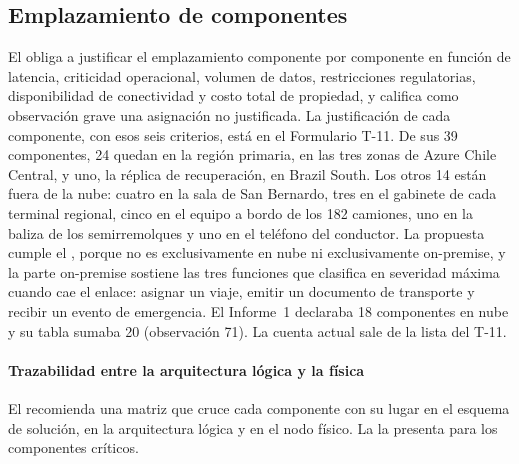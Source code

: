 \subsection{Emplazamiento de componentes}\label{sec:4-emplazamiento}

El  obliga a justificar el emplazamiento componente por componente en función de
latencia, criticidad operacional, volumen de datos, restricciones regulatorias, disponibilidad de
conectividad y costo total de propiedad, y califica como observación grave una asignación no
justificada. La justificación de cada componente, con esos seis criterios, está en el Formulario T-11. De sus 39
componentes, 24 quedan en la región primaria, en las tres zonas de Azure Chile Central, y uno, la
réplica de recuperación, en Brazil South. Los otros 14 están fuera de la nube: cuatro en la sala de San
Bernardo, tres en el gabinete de cada terminal regional, cinco en el equipo a bordo de los 182 camiones,
uno en la baliza de los semirremolques y uno en el teléfono del conductor. La propuesta cumple el
, porque no es exclusivamente en nube ni exclusivamente on-premise, y la parte on-premise
sostiene las tres funciones que  clasifica en severidad máxima cuando cae el enlace:
asignar un viaje, emitir un documento de transporte y recibir un evento de emergencia. El Informe~1
declaraba 18 componentes en nube y su tabla sumaba 20 (observación 71). La cuenta actual sale de la
lista del T-11.

\paragraph{Trazabilidad entre la arquitectura lógica y la física} El 
recomienda una matriz que cruce cada componente con su lugar en el esquema de solución, en la
arquitectura lógica y en el nodo físico. La  la presenta para los componentes
críticos.

